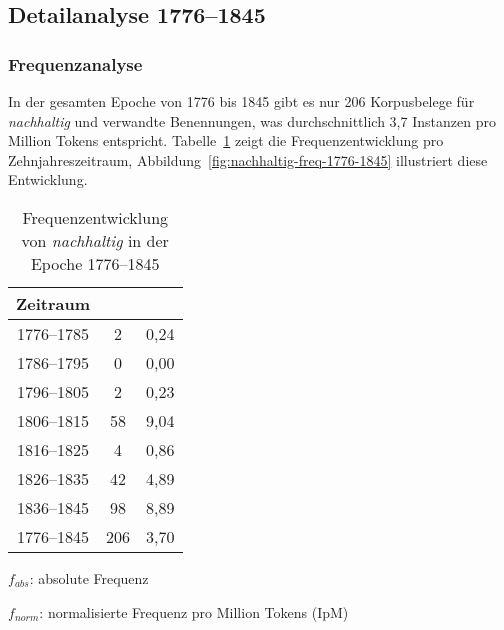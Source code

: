 \documentclass[
    german,
    a4paper,%
    12pt,%
    oneside,%
    toc=bibliography,
    final,
]{scrartcl}
\begin{document}
\subsection{Detailanalyse 1776–1845}
\label{subsec:detail-1776–1845}


\subsubsection{Frequenzanalyse}

In der gesamten Epoche von 1776 bis 1845 gibt es nur 206 Korpusbelege für \textit{nachhaltig} und verwandte Benennungen, was durchschnittlich 3,7 Instanzen pro Million Tokens entspricht. Tabelle~\ref{tab:freq-epoche1} zeigt die Frequenzentwicklung pro Zehnjahreszeitraum, Abbildung~\ref{fig:nachhaltig-freq-1776-1845} illustriert diese Entwicklung.

\begin{table}[h!]
	\centering
	\renewcommand{\arraystretch}{1.5}
	
	\caption{Frequenzentwicklung von \textit{nachhaltig} in der Epoche 1776–1845}
	\label{tab:freq-epoche1}
	
	\begin{threeparttable}
	
	\begin{tabular}{ccc}
	\textbf{Zeitraum} & \boldmath{$f_{abs}$} & \boldmath{$f_{norm}$} \\ \hline
	1776–1785 & 2 & 0,24 \\ \hline
	1786–1795 & 0 & 0,00 \\ \hline
	1796–1805 & 2 & 0,23 \\ \hline
	1806–1815 & 58 & 9,04 \\ \hline
	1816–1825 & 4 & 0,86 \\ \hline
	1826–1835 & 42 & 4,89 \\ \hline
	1836–1845 & 98 & 8,89 \\ \hline\hline
	1776–1845 & 206 & 3,70 \\ \hline
	\end{tabular} 
	
	\begin{tablenotes}
	\footnotesize
	\setlength{\itemindent}{-1.2em}
	\item $f_{abs}$: absolute Frequenz
	\item $f_{norm}$: normalisierte Frequenz pro Million Tokens (IpM)
	\end{tablenotes}
	
	\end{threeparttable}
\end{table}
\end{document}

